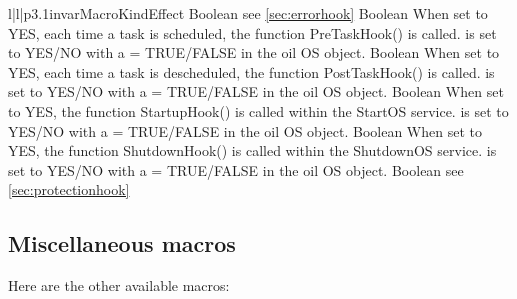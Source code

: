 \begin{longtableiii}{l|l|p{3.1in}}{var}{Macro}{Kind}{Effect}
  {Boolean}
  {see \ref{sec:errorhook}}
  {Boolean}
  {When set to YES, each time a task is scheduled, the function PreTaskHook() is called.
   is set to YES/NO with a  = TRUE/FALSE
  in the oil OS object.}
  {Boolean}
  {When set to YES, each time a task is descheduled, the function PostTaskHook() is called.
   is set to YES/NO with a  = TRUE/FALSE
  in the oil OS object.}
  {Boolean}
  {When set to YES, the function StartupHook() is called within the StartOS service.
   is set to YES/NO with a  = TRUE/FALSE
  in the oil OS object.}
  {Boolean}
  {When set to YES, the function ShutdownHook() is called within the ShutdownOS service.
   is set to YES/NO with a  = TRUE/FALSE
  in the oil OS object.}
  {Boolean}
  {see \ref{sec:protectionhook}}
\end{longtableiii}

\subsection{Miscellaneous macros}

Here are the other available macros:

